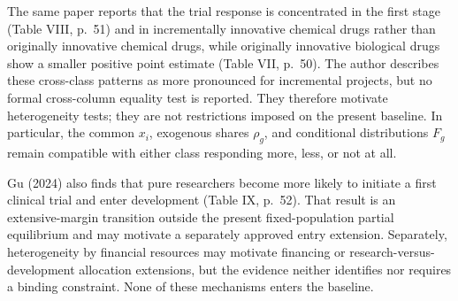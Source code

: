 \documentclass[11pt]{article}
\begin{document}
The same paper reports that the trial response is concentrated in the first
stage (Table VIII, p.~51) and in incrementally innovative chemical drugs
rather than originally innovative chemical drugs, while originally
innovative biological drugs show a smaller positive point estimate
(Table VII, p.~50). The author describes these cross-class patterns as more
pronounced for incremental projects, but no formal cross-column equality test
is reported. They therefore motivate heterogeneity tests; they are not
restrictions imposed on the present baseline. In particular, the common
\(x_i\), exogenous shares \(\rho_g\), and conditional distributions \(F_g\)
remain compatible with either class responding more, less, or not at all.

Gu (2024) also finds that pure researchers become more likely to initiate a
first clinical trial and enter development (Table IX, p.~52). That result is
an extensive-margin transition outside the present fixed-population partial
equilibrium and may motivate a separately approved entry extension.
Separately, heterogeneity by financial resources may motivate financing or
research-versus-development allocation extensions, but the evidence neither
identifies nor requires a binding constraint. None of these mechanisms enters
the baseline.



\end{document}
